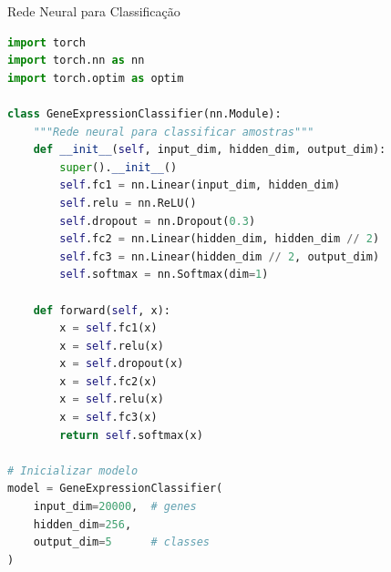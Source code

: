 \begin{frame}[fragile]{Rede Neural para Classificação}
\begin{lstlisting}[language=Python, caption=RNA simples com PyTorch, basicstyle=\ttfamily\footnotesize]
import torch
import torch.nn as nn
import torch.optim as optim

class GeneExpressionClassifier(nn.Module):
    """Rede neural para classificar amostras"""
    def __init__(self, input_dim, hidden_dim, output_dim):
        super().__init__()
        self.fc1 = nn.Linear(input_dim, hidden_dim)
        self.relu = nn.ReLU()
        self.dropout = nn.Dropout(0.3)
        self.fc2 = nn.Linear(hidden_dim, hidden_dim // 2)
        self.fc3 = nn.Linear(hidden_dim // 2, output_dim)
        self.softmax = nn.Softmax(dim=1)

    def forward(self, x):
        x = self.fc1(x)
        x = self.relu(x)
        x = self.dropout(x)
        x = self.fc2(x)
        x = self.relu(x)
        x = self.fc3(x)
        return self.softmax(x)

# Inicializar modelo
model = GeneExpressionClassifier(
    input_dim=20000,  # genes
    hidden_dim=256,
    output_dim=5      # classes
)
\end{lstlisting}
\end{frame}

